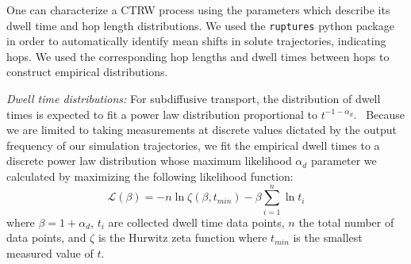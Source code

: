 \documentclass{article}
\begin{document}
  One can characterize a CTRW process using the parameters which describe its dwell 
  time and hop length distributions. We used the \texttt{ruptures} python package in 
  order to automatically identify mean shifts in solute trajectories, indicating hops.\cite{truong_ruptures:_2018} 
  We used the corresponding hop lengths and dwell times between hops to construct 
  empirical distributions.
  
  \textit{Dwell time distributions:} For subdiffusive transport, the distribution 
  of dwell times is expected to fit a power law distribution 
  proportional to $t^{-1-\alpha_d}$.~\cite{meroz_toolbox_2015}
  Because we are limited to taking measurements at discrete values dictated by the output 
  frequency of our simulation trajectories, we fit the empirical dwell times
  to a discrete power law distribution whose maximum likelihood $\alpha_d$ 
  parameter we calculated by maximizing the following likelihood function: 
  \begin{equation}
	\mathcal{L}(\beta) = -n\ln \zeta(\beta, t_{min}) -
	\beta\sum_{i=1}^{n} \ln t_i 
  \label{eqn:powerlaw_likelihood}
  \end{equation}
  where $\beta = 1 + \alpha_d$, $t_i$ are collected dwell time data points,
  $n$ the total number of data points, and $\zeta$ is the Hurwitz zeta function
  where $t_{min}$ is the smallest measured value of	$t$.~\cite{clauset_power-law_2009}
  
\end{document}
